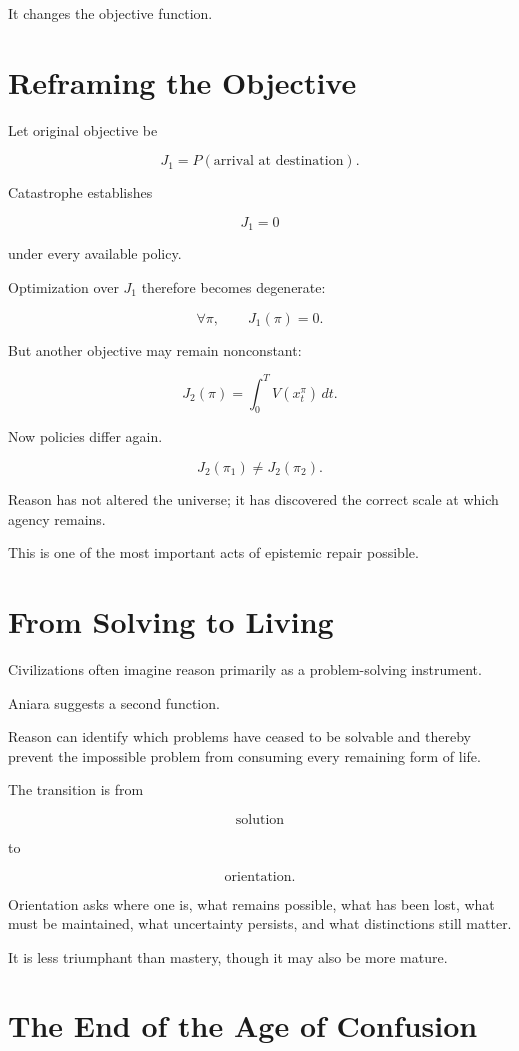 \documentclass[11pt,oneside]{book}
\theoremstyle{definition}
\theoremstyle{remark}
\begin{document}
It changes the objective function.

\section{Reframing the Objective}

Let original objective be

\[
J_1
=
P(\text{arrival at destination}).
\]

Catastrophe establishes

\[
J_1=0
\]

under every available policy.

Optimization over \(J_1\) therefore becomes degenerate:

\[
\forall\pi,\qquad J_1(\pi)=0.
\]

But another objective may remain nonconstant:

\[
J_2(\pi)
=
\int_0^T
V(x_t^\pi)\,dt.
\]

Now policies differ again.

\[
J_2(\pi_1)\neq J_2(\pi_2).
\]

Reason has not altered the universe; it has discovered the correct scale at which agency remains.

This is one of the most important acts of epistemic repair possible.

\section{From Solving to Living}

Civilizations often imagine reason primarily as a problem-solving instrument.

Aniara suggests a second function.

Reason can identify which problems have ceased to be solvable and thereby prevent the impossible problem from consuming every remaining form of life.

The transition is from

\[
\text{solution}
\]

to

\[
\text{orientation}.
\]

Orientation asks where one is, what remains possible, what has been lost, what must be maintained, what uncertainty persists, and what distinctions still matter.

It is less triumphant than mastery, though it may also be more mature.

\section{The End of the Age of Confusion}
\end{document}
